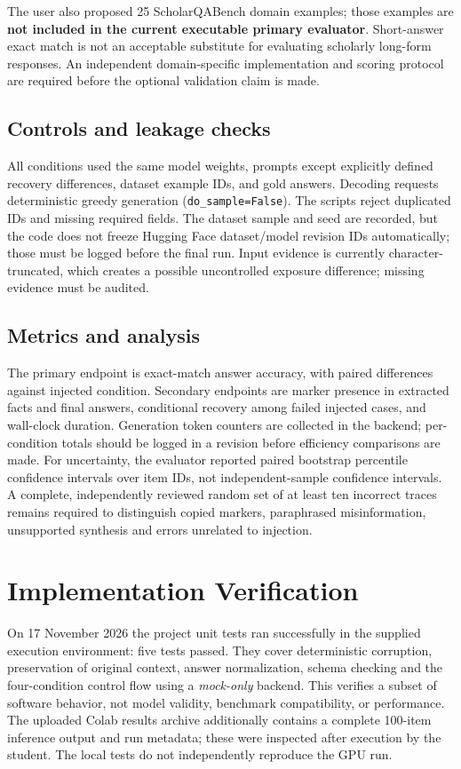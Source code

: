 \documentclass[11pt,onecolumn,journal]{IEEEtran}
\begin{document}
The user also proposed 25 ScholarQABench domain examples; those examples are \textbf{not included in the current executable primary evaluator}. Short-answer exact match is not an acceptable substitute for evaluating scholarly long-form responses. An independent domain-specific implementation and scoring protocol are required before the optional validation claim is made.

\subsection{Controls and leakage checks}
All conditions used the same model weights, prompts except explicitly defined recovery differences, dataset example IDs, and gold answers. Decoding requests deterministic greedy generation (\texttt{do\_sample=False}). The scripts reject duplicated IDs and missing required fields. The dataset sample and seed are recorded, but the code does not freeze Hugging Face dataset/model revision IDs automatically; those must be logged before the final run. Input evidence is currently character-truncated, which creates a possible uncontrolled exposure difference; missing evidence must be audited.

\subsection{Metrics and analysis}
The primary endpoint is exact-match answer accuracy, with paired differences against injected condition. Secondary endpoints are marker presence in extracted facts and final answers, conditional recovery among failed injected cases, and wall-clock duration. Generation token counters are collected in the backend; per-condition totals should be logged in a revision before efficiency comparisons are made. For uncertainty, the evaluator reported paired bootstrap percentile confidence intervals over item IDs, not independent-sample confidence intervals. A complete, independently reviewed random set of at least ten incorrect traces remains required to distinguish copied markers, paraphrased misinformation, unsupported synthesis and errors unrelated to injection.

\section{Implementation Verification}
On 17 November 2026 the project unit tests ran successfully in the supplied execution environment: five tests passed. They cover deterministic corruption, preservation of original context, answer normalization, schema checking and the four-condition control flow using a \emph{mock-only} backend. This verifies a subset of software behavior, not model validity, benchmark compatibility, or performance. The uploaded Colab results archive additionally contains a complete 100-item inference output and run metadata; these were inspected after execution by the student. The local tests do not independently reproduce the GPU run.
\end{document}
